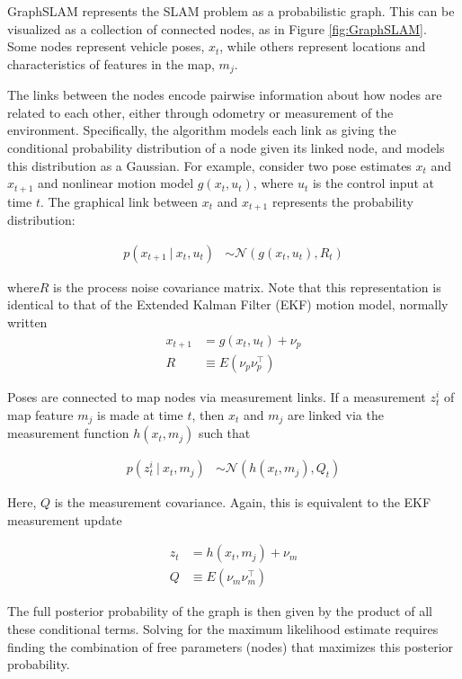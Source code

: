 GraphSLAM represents the SLAM problem as a probabilistic graph. This can be visualized as a collection of connected nodes, as in Figure \ref{fig:GraphSLAM}. Some nodes represent vehicle poses, $x_t$, while others represent locations and characteristics of features in the map, $m_j$. 

The links between the nodes encode pairwise information about how nodes are related to each other, either through odometry or measurement of the environment. Specifically, the algorithm models each link as giving the conditional probability distribution of a node given its linked node, and models this distribution as a Gaussian. For example, consider two pose estimates $x_t$ and  $x_{t+1}$ and nonlinear motion model $g(x_t,u_t)$, where $u_t$ is the control input at time $t$. The graphical link between $x_t$ and  $x_{t+1}$ represents the probability distribution: 

\begin{align}
p\left(x_{t+1}~|~x_t,u_t\right) & \sim \mathcal{N}\left(g(x_t,u_t), R_t\right)
\label {eq:Gauss1}
\end{align}

\noindent where$R$ is the process noise covariance matrix. Note that this representation is identical to that of the Extended Kalman Filter (EKF) motion model, normally written 
\begin{align}
x_{t+1} &= g\left(x_t,u_t\right) + \nu_p\\
R &\equiv E\left(\nu_p \nu_p^\intercal\right) 
\end{align}

Poses are connected to map nodes via measurement links. If a measurement $z^i_t$ of map feature $m_j$ is made at time $t$, then $x_t$ and $m_j$ are linked via the measurement function $h \left(x_t,m_j\right)$ such that 

\begin{align}
p\left(z^i_{t}~|~x_t,m_j\right) & \sim \mathcal{N}\left(h(x_t,m_j), Q_t\right)
\label {eq:Gauss2}
\end{align}

Here, $Q$ is the measurement covariance. Again, this is equivalent to the EKF measurement update

\begin{align}
z_{t} &= h\left(x_t,m_j\right) + \nu_m\\
Q &\equiv E\left(\nu_m \nu_m^\intercal\right) 
\end{align}

The full posterior probability of the graph is then given by the product of all these conditional terms. Solving for the maximum likelihood estimate requires finding the combination of free parameters (nodes) that maximizes this posterior probability. 

